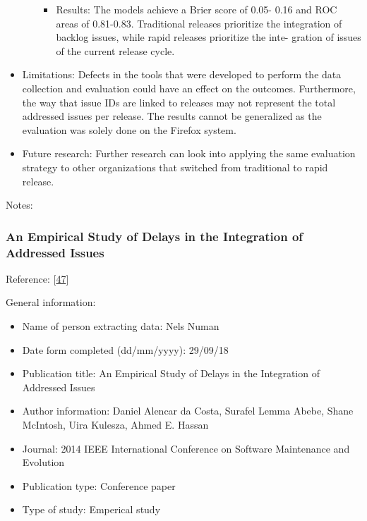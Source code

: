 \documentclass[]{book}
\providecommand{\tightlist}{%
  \setlength{\itemsep}{0pt}\setlength{\parskip}{0pt}}
\begin{document}
\begin{itemize}
\begin{itemize}
    \begin{itemize}
    \tightlist
    \item
      Results: The models achieve a Brier score of 0.05- 0.16 and ROC
      areas of 0.81-0.83. Traditional releases prioritize the
      integration of backlog issues, while rapid releases prioritize the
      inte- gration of issues of the current release cycle.
    \end{itemize}
  \end{itemize}
\item
  Limitations: Defects in the tools that were developed to perform the
  data collection and evaluation could have an effect on the outcomes.
  Furthermore, the way that issue IDs are linked to releases may not
  represent the total addressed issues per release. The results cannot
  be generalized as the evaluation was solely done on the Firefox
  system.
\item
  Future research: Further research can look into applying the same
  evaluation strategy to other organizations that switched from
  traditional to rapid release.
\end{itemize}

Notes:

\subsubsection{An Empirical Study of Delays in the Integration of
Addressed
Issues}\label{an-empirical-study-of-delays-in-the-integration-of-addressed-issues}

Reference: {[}\protect\hyperlink{ref-da2014a}{47}{]}

General information:

\begin{itemize}
\tightlist
\item
  Name of person extracting data: Nels Numan
\item
  Date form completed (dd/mm/yyyy): 29/09/18
\item
  Publication title: An Empirical Study of Delays in the Integration of
  Addressed Issues
\item
  Author information: Daniel Alencar da Costa, Surafel Lemma Abebe,
  Shane McIntosh, Uira Kulesza, Ahmed E. Hassan
\item
  Journal: 2014 IEEE International Conference on Software Maintenance
  and Evolution
\item
  Publication type: Conference paper
\item
  Type of study: Emperical study
\end{itemize}
\end{document}
